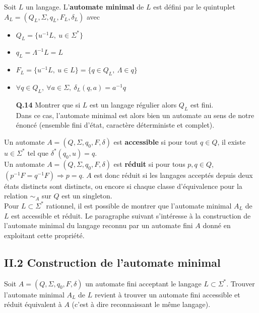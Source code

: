 \documentclass[11pt,a4paper]{article}\nofiles
\begin{document}
Soit $L$ un langage. L'\textbf{automate minimal} de $L$ est d\'efini par le quintuplet $A_L=(Q_L,\Sigma,q_L,F_L,\delta_L)$ avec
\begin{itemize}
\item $Q_L=\{u^{-1}L,\ u\in \Sigma^*\}$
\item $q_L=\Lambda^{-1}L=L$
\item $F_L=\{u^{-1}L,\ u\in L\}=\{q\in Q_L,\ \Lambda \in q\}$
\item $\forall q\in Q_L,\ \forall a\in \Sigma,\ \delta_L(q,a)=a^{-1}q$
\end{itemize}

\begin{enumerate}
\item[{\bf Q.14}] Montrer que si $L$ est un langage r\'egulier alors $Q_L$ est fini.\\
Dans ce cas, l'automate minimal est alors bien un automate au sens de notre \'enonc\'e (ensemble fini d'\'etat, caract\`ere d\'eterministe et complet).
\end{enumerate}

Un automate $A=(Q,\Sigma,q_0,F,\delta)$ est \textbf{accessible} si pour tout $q\in Q$, il existe $u\in \Sigma^*$ tel que $\delta^*(q_0,u)=q$.\\

Un automate $A=(Q,\Sigma,q_0,F,\delta)$ est \textbf{r\'eduit} si pour tous $p,q\in Q$, $(p^{-1}F=q^{-1}F)\Rightarrow p=q$. $A$ est donc r\'eduit si les langages accept\'es depuis deux \'etats distincts sont distincts, ou encore si chaque classe d'\'equivalence pour la relation $\sim_A$ sur $Q$ est un singleton.\\

Pour $L\subset \Sigma^*$ rationnel, il est possible de montrer que l'automate minimal $A_L$ de $L$ est accessible et r\'eduit. Le paragraphe suivant s'int\'eresse \`a la construction de l'automate minimal du langage reconnu par un automate fini $A$ donn\'e en exploitant cette propri\'et\'e.

\subsection*{II.2 Construction de l'automate minimal}
Soit $A=(Q,\Sigma,q_0,F,\delta)$ un automate fini acceptant le langage $L\subset \Sigma^*$. 
Trouver l'automate minimal $A_L$ de $L$ revient \`a trouver un automate fini accessible et r\'eduit \'equivalent \`a $A$ (c'est \`a dire reconnaissant le m\^eme langage).\\
\end{document}
